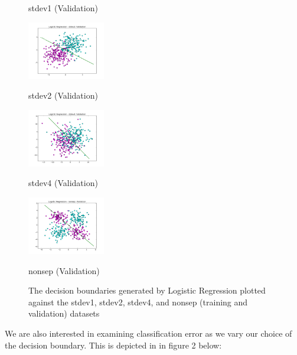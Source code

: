 \documentclass[10pt]{article}
\begin{document}
\begin{figure}[ht]
\begin{minipage}[b]{.24\linewidth}
		\caption*{stdev1 (Validation)}
	\end{minipage}
	\begin{minipage}[b]{.24\linewidth}
		\includegraphics[width=1\linewidth, height=1in]{LR_stdev2_validation.png}
		\caption*{stdev2 (Validation)}
	\end{minipage}
	\begin{minipage}[b]{.24\linewidth}
		\includegraphics[width=1\linewidth, height=1in]{LR_stdev4_validation.png}
		\caption*{stdev4 (Validation)}
	\end{minipage}
	\begin{minipage}[b]{.24\linewidth}
		\includegraphics[width=1\linewidth, height=1in]{LR_nonsep_validation.png}
		\caption*{nonsep (Validation)}
	\end{minipage}
	\caption{The decision boundaries generated by Logistic Regression plotted against the stdev1, stdev2, stdev4, and nonsep (training and validation) datasets}
\end{figure}

We are also interested in examining classification error as we vary our choice of the decision boundary. This is depicted in in figure 2 below:
\end{document}
